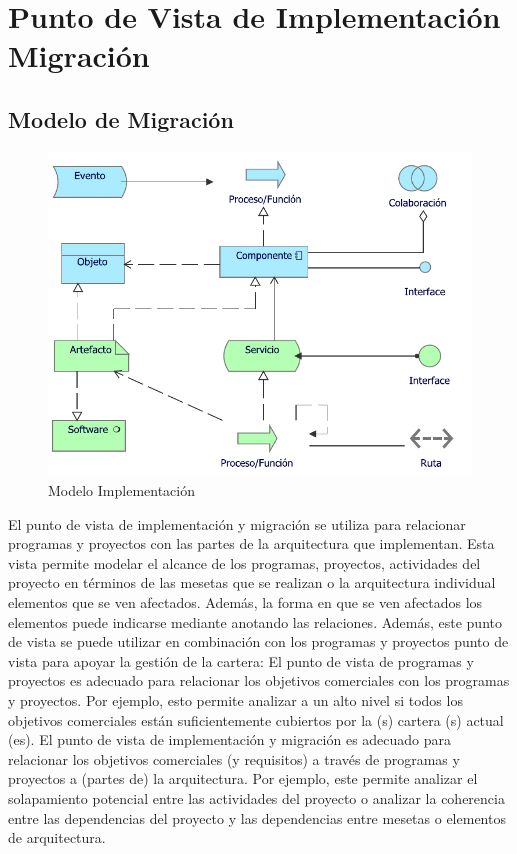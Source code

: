 \section{Punto de Vista de Implementación Migración}
\subsection{Modelo de Migración}
\begin{figure}[h!]
	\centering
	\includegraphics[width=.9\linewidth]{imgs/modelo/Implementacion.pdf}
	\caption{Modelo Implementación}
\end{figure}
El punto de vista de implementación y migración se utiliza para relacionar programas y proyectos con las partes de la arquitectura que implementan.  Esta vista permite modelar el alcance de los programas, proyectos, actividades del proyecto en términos de las mesetas que se realizan o la arquitectura individual elementos que se ven afectados.  Además, la forma en que se ven afectados los elementos puede indicarse mediante anotando las relaciones.
Además, este punto de vista se puede utilizar en combinación con los programas y proyectos
punto de vista para apoyar la gestión de la cartera:
El punto de vista de programas y proyectos es adecuado para relacionar los objetivos comerciales con los programas y
proyectos.  Por ejemplo, esto permite analizar a un alto nivel si todos
los objetivos comerciales están suficientemente cubiertos por la (s) cartera (s) actual (es).
El punto de vista de implementación y migración es adecuado para relacionar los objetivos comerciales (y
requisitos) a través de programas y proyectos a (partes de) la arquitectura.  Por ejemplo, este
permite analizar el solapamiento potencial entre las actividades del proyecto o analizar la coherencia entre las dependencias del proyecto y las dependencias entre mesetas o
elementos de arquitectura.

